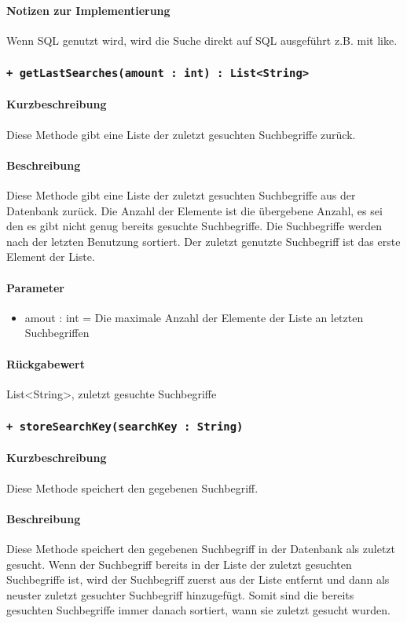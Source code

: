 \paragraph*{Notizen zur Implementierung}
Wenn SQL genutzt wird, wird die Suche direkt auf SQL ausgeführt z.B. mit \dq like\dq{}.

\subsubsection{\texttt{+ getLastSearches(amount : int) : List<String>}}%
\paragraph*{Kurzbeschreibung}
Diese Methode gibt eine Liste der zuletzt gesuchten Suchbegriffe zurück.
\paragraph*{Beschreibung}
Diese Methode gibt eine Liste der zuletzt gesuchten Suchbegriffe aus der Datenbank zurück.
Die Anzahl der Elemente ist die übergebene Anzahl, es sei den es gibt nicht genug bereits gesuchte Suchbegriffe.
Die Suchbegriffe werden nach der letzten Benutzung sortiert. 
Der zuletzt genutzte Suchbegriff ist das erste Element der Liste.
\paragraph*{Parameter}
\begin{itemize}
    \item amout : int = Die maximale Anzahl der Elemente der Liste an letzten Suchbegriffen
\end{itemize}
\paragraph*{Rückgabewert}
List<String>, zuletzt gesuchte Suchbegriffe

\subsubsection{\texttt{+ storeSearchKey(searchKey : String)}}%
\paragraph*{Kurzbeschreibung}
Diese Methode speichert den gegebenen Suchbegriff.
\paragraph*{Beschreibung}
Diese Methode speichert den gegebenen Suchbegriff in der Datenbank als zuletzt gesucht.
Wenn der Suchbegriff bereits in der Liste der zuletzt gesuchten Suchbegriffe ist, 
wird der Suchbegriff zuerst aus der Liste entfernt und dann als neuster zuletzt gesuchter Suchbegriff hinzugefügt.
Somit sind die bereits gesuchten Suchbegriffe immer danach sortiert, wann sie zuletzt gesucht wurden.
